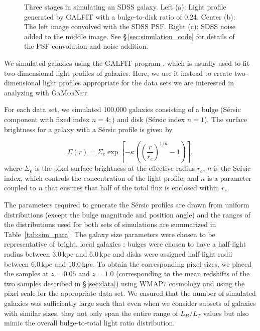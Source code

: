 \documentclass[twocolumn]{aastex63}
\newcommand\sersic{S\'ersic}
\newcommand\gamornet{G\textsc{a}M\textsc{or}N\textsc{et}}
\begin{document}
\begin{figure}[hbt]
\begin{center}
  \end{center}
  \caption{Three stages in simulating an SDSS galaxy. Left (a): Light profile generated by GALFIT with a bulge-to-disk ratio of 0.24. Center (b): The left image convolved with the SDSS PSF. Right (c): SDSS noise added to the middle image. See \S\,\ref{sec:simulation_code} for details of the PSF convolution and noise addition.}
  \label{fig:psf_noise}
\end{figure}

We simulated galaxies using the GALFIT program \citep{galfit}, which is usually used to fit two-dimensional light profiles of galaxies. Here, we use it instead to create two-dimensional light profiles appropriate for the data sets we are interested in analyzing with \gamornet{}.

For each data set, we simulated 100,000 galaxies consisting of a bulge (\sersic{} component with fixed index $n=4$;\,\citet{de_vac_48}) and disk (\sersic{} index $n=1$). The surface brightness for a galaxy with a \sersic{} profile is given by

\begin{equation}
\label{eq:sersic_fn}
\Sigma(r) = \Sigma_e \exp \left[ -\kappa \left( \left( \frac{r}{r_e}\right)^{1/n} - 1 \right) \right] ,
\end{equation}
where $\Sigma_e$ is the pixel surface brightness at the effective radius $r_e$, $n$ is the Se\'rsic index, which controls the concentration of the light profile, and $\kappa$ is a parameter coupled to $n$ that ensures that half of the total flux is enclosed within $r_e$.


The parameters required to generate the \sersic{} profiles are drawn from uniform distributions (except the bulge magnitude and position angle) and the ranges of the distributions used for both sets of simulations are summarized in Table~\ref{tab:sim_para}. The galaxy size parameters were chosen to be representative of bright, local galaxies \citep{binney_and_merrifield}; bulges were chosen to have a half-light radius between $3.0$\,kpc and $6.0$\,kpc and disks were assigned half-light radii between $6.0$\,kpc and $10.0$\,kpc. To obtain the corresponding pixel sizes, we placed the samples at $ z = 0.05$ and $z = 1.0$ (corresponding to the mean redshifts of the two samples described in \S\,\ref{sec:data}) using WMAP7 cosmology \citep{wmap7} and using the pixel scale for the appropriate data set. We ensured that the number of simulated galaxies was sufficiently large such that even when we consider subsets of galaxies with similar sizes, they not only span the entire range of $L_B/L_T$ values but also mimic the overall bulge-to-total light ratio distribution.  
\end{document}
